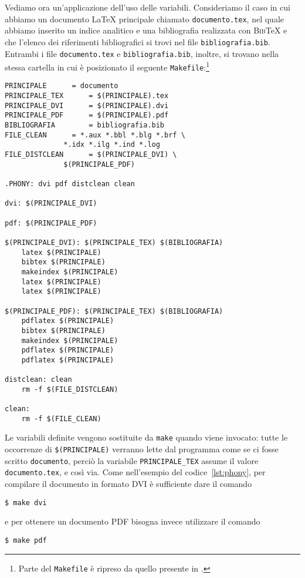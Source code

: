 Vediamo ora un'applicazione dell'uso delle variabili.  Consideriamo il caso in
cui abbiamo un documento \LaTeX{}
principale chiamato \texttt{documento.tex}, nel quale abbiamo inserito un indice
analitico e una bibliografia realizzata con \textsc{Bib}\TeX{}
e che l'elenco dei riferimenti bibliografici si trovi nel file
\texttt{bibliografia.bib}.  Entrambi i file \texttt{documento.tex} e
\texttt{bibliografia.bib}, inoltre, si trovano nella stessa cartella in cui è
posizionato il seguente
\texttt{Makefile}:\footnote{Parte del \texttt{Makefile} è ripreso da quello
  presente in \cite[pagina 61]{caucci:tabelle}.}
\begin{lstlisting}[caption={Esempio di \texttt{Makefile} che utilizza le
variabili.},label=lst:variabili]
PRINCIPALE 		= documento
PRINCIPALE_TEX		= $(PRINCIPALE).tex
PRINCIPALE_DVI		= $(PRINCIPALE).dvi
PRINCIPALE_PDF		= $(PRINCIPALE).pdf
BIBLIOGRAFIA		= bibliografia.bib
FILE_CLEAN		= *.aux *.bbl *.blg *.brf \
			  *.idx *.ilg *.ind *.log
FILE_DISTCLEAN		= $(PRINCIPALE_DVI) \
			  $(PRINCIPALE_PDF)

.PHONY: dvi pdf distclean clean

dvi: $(PRINCIPALE_DVI)

pdf: $(PRINCIPALE_PDF)

$(PRINCIPALE_DVI): $(PRINCIPALE_TEX) $(BIBLIOGRAFIA)
	latex $(PRINCIPALE)
	bibtex $(PRINCIPALE)
	makeindex $(PRINCIPALE)
	latex $(PRINCIPALE)
	latex $(PRINCIPALE)

$(PRINCIPALE_PDF): $(PRINCIPALE_TEX) $(BIBLIOGRAFIA)
	pdflatex $(PRINCIPALE)
	bibtex $(PRINCIPALE)
	makeindex $(PRINCIPALE)
	pdflatex $(PRINCIPALE)
	pdflatex $(PRINCIPALE)

distclean: clean
	rm -f $(FILE_DISTCLEAN)

clean:
	rm -f $(FILE_CLEAN)
\end{lstlisting}
Le variabili definite vengono sostituite da \texttt{make} quando viene invocato:
tutte le occorrenze di \texttt{\$(PRINCIPALE)} verranno lette dal programma come
se ci fosse scritto \texttt{documento}, perciò la variabile
\texttt{PRINCIPALE\_TEX} assume il valore \texttt{documento.tex}, e così
via. Come nell'esempio del codice~\ref{lst:phony}, per compilare il documento in
formato \textsc{DVI} è sufficiente dare il comando
\begin{verbatim}
$ make dvi
\end{verbatim}
e per ottenere un documento \textsc{PDF} bisogna invece utilizzare il comando
\begin{verbatim}
$ make pdf
\end{verbatim}

